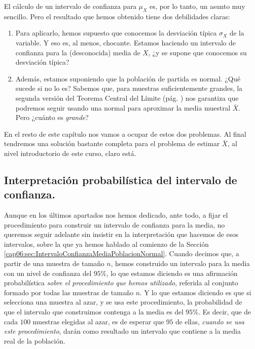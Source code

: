 
El cálculo de un intervalo de confianza para $\mu_X$ es, por lo tanto, un
asunto muy sencillo. Pero el resultado que hemos obtenido tiene dos debilidades
claras:\label{cap06:lugar:PreguntasIntervalosConfianza}
\begin{enumerate}
  \item Para aplicarlo, hemos supuesto que conocemos la desviación típica
      $\sigma_X$ de la variable. Y eso es, al menos, chocante. Estamos
      haciendo un intervalo de confianza para la (desconocida) media de $X$,
      ¿y se supone que conocemos su desviación típica?
  \item Además, estamos suponiendo que la población de partida es normal.
      ¿Qué sucede si no lo es? Sabemos que, para muestras suficientemente
      grandes, la segunda versión del Teorema Central del Límite (pág.
      \pageref{cap06:teo:TCLsegundaVersion}) nos garantiza que podremos
      seguir usando una normal para aproximar la media muestral $\bar X$.
      Pero ¿cuánto es {\em grande}?
\end{enumerate}
En el resto de este capítulo nos vamos a ocupar de estos dos problemas. Al
final tendremos una solución bastante completa para el problema de estimar
$\bar X$, al nivel introductorio de este curso, claro está.

\subsection{Interpretación probabilística del intervalo de confianza.}
\label{cap06:subsec:InterpretacionProbabilisticaIntervaloConfianza}

Aunque en los últimos apartados nos hemos dedicado, ante todo, a fijar el procedimiento para construir un intervalo de confianza para la media, no queremos seguir adelante sin insistir en la interpretación que hacemos de esos intervalos, sobre la que ya hemos hablado al comienzo de la Sección \ref{cap06:sec:IntervaloConfianzaMediaPoblacionNormal}. Cuando decimos que, a partir de una muestra de tamaño $n$, hemos construido un intervalo para la media con un nivel de confianza del $95\%$, lo que estamos diciendo es una afirmación probabilística {\em sobre el procedimiento que hemos utilizado}, referida al conjunto formado por todas las muestras de tamaño $n$. Y lo que estamos diciendo es que si selecciona una muestra al azar, y se usa este procedimiento, la probabilidad de que el intervalo que construimos contenga a la media es del $95\%$. Es decir, que de cada $100$ muestras elegidas al azar, es de esperar que $95$ de ellas, {\em cuando se usa este procedimiento}, darán como resultado un intervalo que contiene a la media real de la población.

